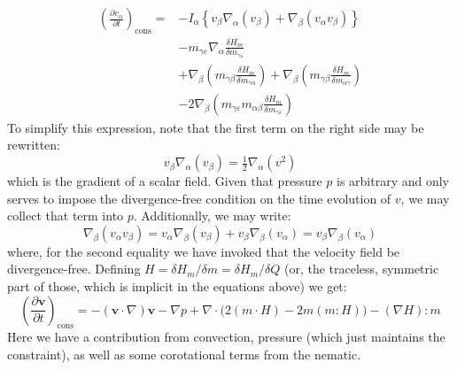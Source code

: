 \documentclass[reqno]{article}
\begin{document}
  \begin{equation}
    \begin{split}
    \left( \frac{\partial v_\alpha}{\partial t} \right)_\text{cons}
    =
    &-I_{\alpha} \left\{ v_\beta \nabla_\alpha \left(  v_\beta \right)
      + \nabla_\beta \left( v_\alpha v_\beta \right)
    \right\} \\
    &- m_{\gamma\varepsilon} \nabla_\alpha \frac{\delta H_m}{\delta m_{\gamma\varepsilon}} \\
    &+ \nabla_\beta \left( m_{\gamma\beta} \frac{\delta H_m}{\delta m_{\gamma\alpha}} \right)
    + \nabla_\beta \left( m_{\gamma\beta} \frac{\delta H_m}{\delta m_{\alpha \gamma}} \right) \\
    &- 2 \nabla_\beta \left( m_{\gamma\varepsilon} m_{\alpha\beta} \frac{\delta H_m}{\delta m_{\gamma\varepsilon}} \right)
    \end{split}
  \end{equation}
  To simplify this expression, note that the first term on the right side may be
  rewritten:
  \begin{equation}
    v_\beta \nabla_\alpha ( v_\beta) = \tfrac12 \nabla_\alpha ( v^2)
  \end{equation}
  which is the gradient of a scalar field.
  Given that pressure $p$ is arbitrary and only serves to impose the
  divergence-free condition on the time evolution of $v$, we may collect that term into $p$.
  Additionally, we may write:
  \begin{equation}
    \nabla_\beta \left(  v_\alpha v_\beta \right)
    = v_\alpha \nabla_\beta \left(  v_\beta \right) + v_\beta \nabla_\beta \left(  v_\alpha \right)
    = v_\beta \nabla_\beta \left(  v_\alpha \right)
  \end{equation}
  where, for the second equality we have invoked that the velocity field be
  divergence-free.
  Defining $H = \delta H_m / \delta m = \delta H_m / \delta Q$ (or, the
  traceless, symmetric part of those, which is implicit in the equations above)
  we get:
  \begin{equation}
    \left( \frac{\partial \mathbf{v}}{\partial t} \right)_\text{cons}
    =
    - \left(\mathbf{v}\cdot \nabla\right) \mathbf{v}
    - \nabla p
    + \nabla \cdot \biggl(
    2 (m \cdot H) - 2 m (m : H)
      \biggr)
      - \left( \nabla H \right) : m
  \end{equation}
  Here we have a contribution from convection, pressure (which just maintains
  the constraint), as well as some corotational terms from the nematic.
\end{document}
